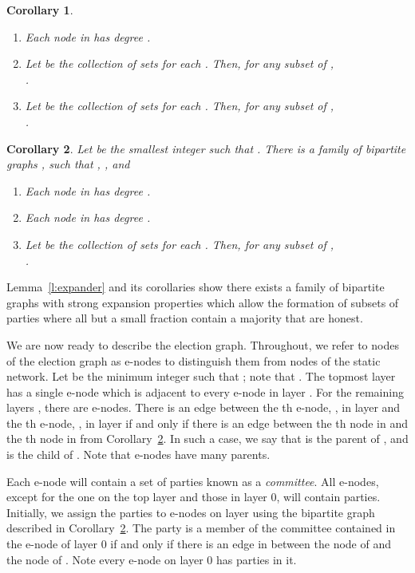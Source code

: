 \documentclass[11pt,letter]{article}
\theoremstyle{mytheoremstyle}
\newtheorem{corollary}{Corollary}
\begin{document}
\begin{description}
{\begin{corollary}
\begin{enumerate}
		\item Each node in  has degree .
		
		\item Let  be the collection of sets  for each . Then, for any subset  of ,\\
		.
		
		\item Let  be the collection of sets  for each . Then, for any subset  of ,\\
		.		
	\end{enumerate}
	
\end{corollary}

\begin{corollary}
	\label{l:expander graph family}  Let  be the smallest integer such that . There is a family of bipartite graphs , such that , , and
	
	\begin{enumerate}		
		\item Each node in  has degree .		
		\item Each node in  has degree .		
		\item Let  be the collection of sets  for each . Then, for any subset  of ,\\
		.		
	\end{enumerate}
	
\end{corollary}

Lemma~\ref{l:expander} and its corollaries show there exists a family of bipartite graphs with strong expansion properties which allow the formation of subsets of parties where all but a small fraction contain a majority that are honest.

We are now ready to describe the election graph. Throughout, we refer to nodes of the election graph as \textsf{e-node}s to distinguish them from nodes of the static network. Let  be the minimum integer  such that ; note that . The topmost layer  has a single \textsf{e-node} which is adjacent to every \textsf{e-node} in layer . For the remaining layers , there are  \textsf{e-node}s. There is an edge between the th \textsf{e-node}, ,  in layer  and the th \textsf{e-node}, , in layer  if and only if there is an edge between the th node in  and the th node in  from Corollary~\ref{l:expander graph family}. In such a case, we say that  is the parent of , and  is the child of . Note that \textsf{e-node}s have many parents.

Each \textsf{e-node} will contain a set of parties known as a {\it committee}. All \textsf{e-node}s, except for the one on the top layer and those in layer 0, will contain  parties. Initially, we assign the  parties to \textsf{e-node}s on layer  using the bipartite graph  described in Corollary~\ref{l:expander graph family}. The  party is a member of the committee contained in the  \textsf{e-node} of layer 0 if and only if there is an edge in  between the  node of  and the  node of . Note every \textsf{e-node} on layer 0 has  parties in it.

}
\end{description}
\end{document}

